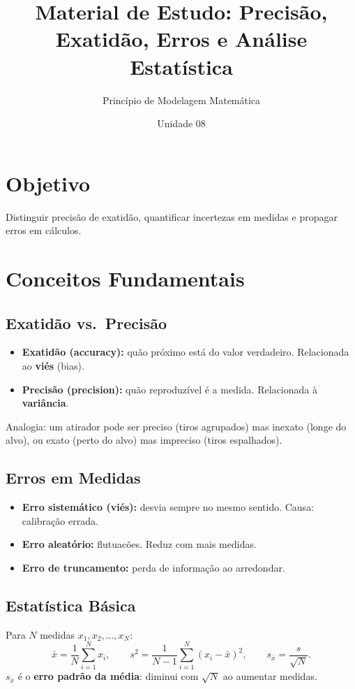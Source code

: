 \documentclass[12pt,a4paper]{article}
\title{Material de Estudo: Precis\~ao, Exatid\~ao, Erros e An\'alise Estat\'istica}
\author{Princ\'ipio de Modelagem Matem\'atica}
\date{Unidade 08}
\begin{document}
\maketitle

\section*{Objetivo}
Distinguir precis\~ao de exatid\~ao, quantificar incertezas em medidas e propagar erros em c\'alculos.

\section*{Conceitos Fundamentais}

\subsection*{Exatid\~ao vs.\ Precis\~ao}
\begin{itemize}
  \item \textbf{Exatid\~ao (accuracy):} qu\~ao pr\'oximo est\'a do valor verdadeiro. Relacionada ao \textbf{vi\'es} (bias).
  \item \textbf{Precis\~ao (precision):} qu\~ao reproduz\'ivel \'e a medida. Relacionada \`a \textbf{vari\^ancia}.
\end{itemize}
Analogia: um atirador pode ser preciso (tiros agrupados) mas inexato (longe do alvo), ou exato (perto do alvo) mas impreciso (tiros espalhados).

\subsection*{Erros em Medidas}
\begin{itemize}
  \item \textbf{Erro sistem\'atico (vi\'es):} desvia sempre no mesmo sentido. Causa: calibra\c{c}\~ao errada.
  \item \textbf{Erro aleat\'orio:} flutuac\~oes. Reduz com mais medidas.
  \item \textbf{Erro de truncamento:} perda de informa\c{c}\~ao ao arredondar.
\end{itemize}

\subsection*{Estat\'istica B\'asica}
Para $N$ medidas $x_1, x_2, \ldots, x_N$:
\[
\bar x = \frac{1}{N}\sum_{i=1}^N x_i, \qquad
s^2 = \frac{1}{N-1}\sum_{i=1}^N (x_i - \bar x)^2, \qquad
s_{\bar x} = \frac{s}{\sqrt{N}}.
\]
$s_{\bar x}$ \'e o \textbf{erro padr\~ao da m\'edia}: diminui com $\sqrt{N}$ ao aumentar medidas.
\end{document}
